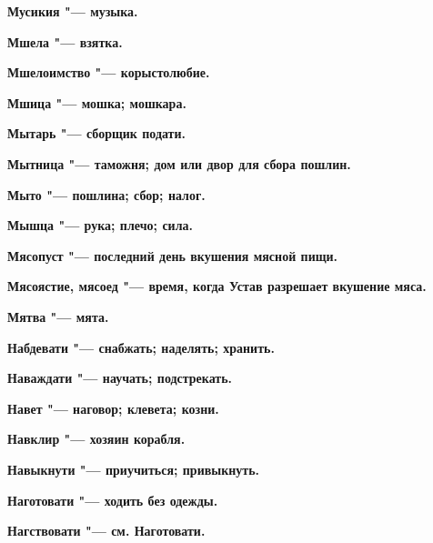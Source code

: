 \bfseries Мусикия \normalfont{} "--- музыка. 




\bfseries Мшела \normalfont{} "--- взятка. 




\bfseries Мшелоимство \normalfont{} "--- корыстолюбие. 




\bfseries Мшица \normalfont{} "--- мошка; мошкара. 




\bfseries Мытарь \normalfont{} "--- сборщик подати. 




\bfseries Мытница \normalfont{} "--- таможня; дом или двор для сбора пошлин. 




\bfseries Мыто \normalfont{} "--- пошлина; сбор; налог. 




\bfseries Мышца \normalfont{} "--- рука; плечо; сила. 




\bfseries Мясопуст \normalfont{} "--- последний день вкушения мясной пищи. 




\bfseries Мясоястие, мясоед \normalfont{} "--- время, когда Устав разрешает вкушение мяса. 




\bfseries Мятва \normalfont{} "--- мята. 




 





\bfseries Набдевати \normalfont{} "--- снабжать; наделять; хранить. 




\bfseries Наваждати \normalfont{} "--- научать; подстрекать. 




\bfseries Навет \normalfont{} "--- наговор; клевета; козни. 




\bfseries Навклир \normalfont{} "--- хозяин корабля. 




\bfseries Навыкнути \normalfont{} "--- приучиться; привыкнуть. 




\bfseries Наготовати \normalfont{} "--- ходить без одежды. 




\bfseries Нагствовати \normalfont{} "--- см. Наготовати. 




